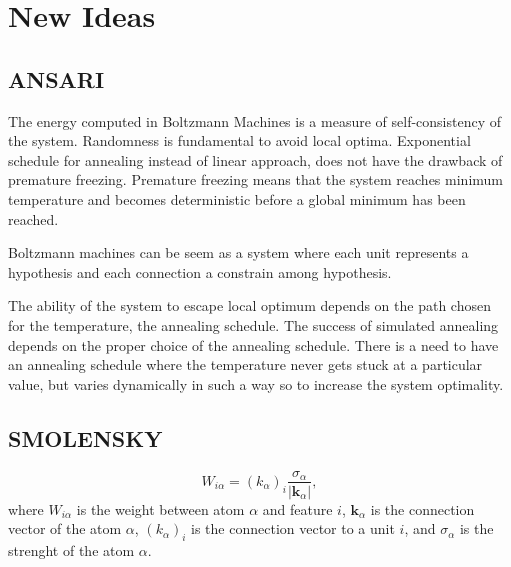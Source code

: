 

\section{New Ideas}
\subsection{ANSARI}

The energy computed in Boltzmann Machines is a measure of self-consistency of the system.
Randomness is fundamental to avoid local optima.
Exponential schedule for annealing instead of linear approach, does not have the drawback of premature freezing.
Premature freezing means that the system reaches minimum temperature and becomes deterministic before a global minimum has been reached.

Boltzmann machines can be seem as a system where each unit represents a hypothesis and each connection a constrain among hypothesis.

The ability of the system to escape local optimum depends on the path chosen for the temperature, the annealing schedule. The success of simulated annealing depends on the proper choice of the annealing schedule.
There is a need to have an annealing schedule where the temperature never gets stuck at a particular value, but varies dynamically in such a way so to increase the system optimality.


\subsection{SMOLENSKY}

\begin{equation}
    \label{eq:smolensky-weights}
    W_{i \alpha} = {\left( k_{\alpha} \right)}_{i} \frac{\sigma_{\alpha}}{|\mathbf{k}_{\alpha}|},
\end{equation}
where $W_{i \alpha}$ is the weight between atom $\alpha$ and feature $i$, $\mathbf{k}_{\alpha}$ is the connection vector of the atom $\alpha$, ${\left( k_{\alpha} \right)}_{i}$ is the connection vector to a unit $i$, and $\sigma_{\alpha}$ is the strenght of the atom $\alpha$.

